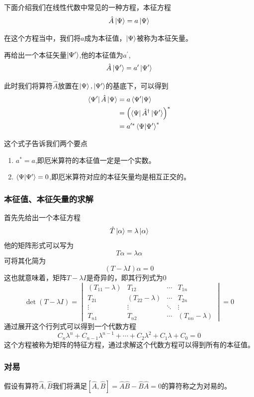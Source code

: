 \documentclass{article}
\newcommand{\h}[1]{\hat{#1}}
\newcommand{\vmfour}[9]{
    \begin{vmatrix}
        #1&#2&\cdots&#3\\
        #4&#5&\cdots&#6\\
        \vdots&\vdots&\ddots&\vdots\\
        #7&#8&\cdots&#9
    \end{vmatrix}
}
\begin{document}
下面介绍我们在线性代数中常见的一种方程，本征方程
\[\hat{A}\ket{\Psi}=a\ket{\Psi}\]

在这个方程当中，我们将$a$成为本征值，$\ket{\Psi}$被称为本征矢量。

再给出一个本征矢量$\ket{\Psi^\prime}$,他的本征值为$a^\prime$,
\[\hat{A}\ket{\Psi^\prime}=a^\prime\ket{\Psi^\prime}\]

此时我们将算符$\hat{A}$放置在$\ket{\Psi},\ket{\Psi^\prime}$的基底下，可以得到
\begin{align*}
    \bra{\Psi^\prime}\hat{A}\ket{\Psi}&=a\braket{\Psi^\prime}{\Psi}\\
    &=\left(\bra{\Psi}\hat{A}^\dagger\ket{\Psi^\prime}\right)^*\\
    &=a^{\prime*}\braket{\Psi}{\Psi^\prime}^*
\end{align*}

这个式子告诉我们两个要点
\begin{enumerate}
    \item $a^*=a$,即厄米算符的本征值一定是一个实数。
    \item $\braket{\Psi}{\Psi^\prime}=0$,即厄米算符对应的本征矢量均是相互正交的。
\end{enumerate}



\subsubsection{本征值、本征矢量的求解}


首先先给出一个本征方程
\[\h{T}\ket{\alpha}=\lambda\ket{\alpha}\]
他的矩阵形式可以写为
\[T\alpha=\lambda\alpha\]
可将其化简为
\[(T-\lambda I)\alpha=0\]
这也就意味着，矩阵$T-\lambda I$是奇异的，即其行列式为0
\[\det(T-\lambda I)=\vmfour{(T_{11}-\lambda)}{T_{12}}{T_{1n}}{T_{21}}{(T_{22}-\lambda)}{T_{2n}}{T_{n1}}{T_{n2}}{(T_{nn}-\lambda)}=0\]
通过展开这个行列式可以得到一个代数方程
\[C_n\lambda^n+C_{n-1}\lambda^{n-1}+\cdots+C_2\lambda^2+C_1\lambda+C_0=0\]
这个方程被称为矩阵的特征方程，通过求解这个代数方程可以得到所有的本征值。










\subsubsection{对易}

假设有算符$\hat{A},\hat{B}$我们将满足$[\hat{A},\hat{B}]=\hat{A}\hat{B}-\hat{B}\hat{A}=0$的算符称之为对易的。
\end{document}
